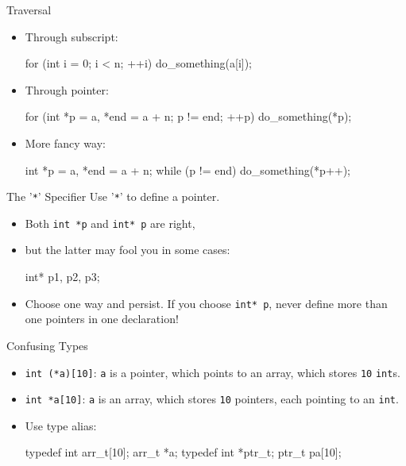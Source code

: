 \documentclass[handout]{beamer}
\newcommand{\ttt}[1]{\texttt{#1}}
\begin{document}
\begin{frame}[fragile]{Traversal}
	\begin{itemize}
		\item Through subscript:
		\begin{cpp}
for (int i = 0; i < n; ++i)
  do_something(a[i]);
		\end{cpp}
		\item Through pointer:
		\begin{cpp}
for (int *p = a, *end = a + n; p != end; ++p)
  do_something(*p);
		\end{cpp}
		\pause
		\item More fancy way:
		\begin{cpp}
int *p = a, *end = a + n;
while (p != end)
  do_something(*p++);
		\end{cpp}
	\end{itemize}
\end{frame}

\begin{frame}[fragile]{The '\ttt{*}' Specifier}
	Use '\ttt{*}' to define a pointer.
	\begin{itemize}
		\item Both \ttt{int *p} and \ttt{int* p} are right,
		\pause
		\item but the latter may fool you in some cases:
		\begin{cpp}
int* p1, p2, p3;
		\end{cpp}
		\pause
		\item Choose one way and persist. If you choose \ttt{int* p}, never define more than one pointers in one declaration!
	\end{itemize}
\end{frame}

\begin{frame}[fragile]{Confusing Types}
	\begin{itemize}
		\item \ttt{int (*a)[10]}: \ttt{a} is a pointer, which points to an array, which stores \ttt{10} \ttt{int}s.
		\item \ttt{int *a[10]}: \ttt{a} is an array, which stores \ttt{10} pointers, each pointing to an \ttt{int}.
		\pause
		\item Use type alias:
		\begin{cpp}
typedef int arr_t[10];
arr_t *a;
typedef int *ptr_t;
ptr_t pa[10];
		\end{cpp}
	\end{itemize}
\end{frame}
\end{document}
